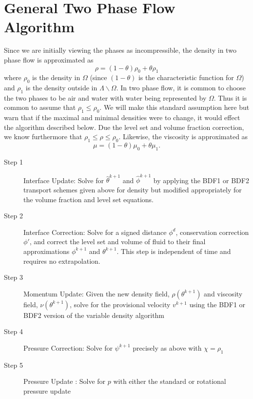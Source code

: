 \documentclass[letterpaper]{erdc}
\begin{document}
%
%
%
\section{General Two Phase Flow Algorithm}\label{sec:General2PFlowAlgorithm}

Since we are initially viewing the phases as incompressible, the density in two
phase flow is approximated as
\begin{equation}
  \rho = (1-\theta) \rho_0 + \theta \rho_1
\end{equation}
where $\rho_0$ is the density in $\Omega$ (since $(1-\theta)$ is the
characteristic function for $\Omega$) and $\rho_1$ is the density outside in
$\Lambda\backslash\Omega$. In two phase flow, it is common to choose the two
phases to be air and water with water being represented by $\Omega$.  Thus it
is common to assume that $\rho_1 \leq \rho_0$.  We will make this standard
assumption here but warn that if the maximal and minimal densities were to
change, it would effect the algorithm described below. Due the level set and
volume fraction correction, we know furthermore that
$\rho_1 \leq \rho \leq \rho_0$.  Likewise, the viscosity is approximated as
\begin{equation}
  \mu = (1-\theta) \mu_0 + \theta \mu_1.
\end{equation}

\begin{description}
\item[Step 1] Interface Update: Solve for $\hat{\theta}^{k+1}$ and
  $\hat{\phi}^{k+1}$ by applying the BDF1 or BDF2 transport schemes given above
  for density but modified appropriately for the volume fraction and level set
  equations.
\item[Step 2] Interface Correction: Solve for a signed distance $\phi^d$,
  conservation correction $\phi'$, and correct the level set and volume of
  fluid to their final approximations $\phi^{k+1}$ and $\theta^{k+1}$. This
  step is independent of time and requires no extrapolation.
\item [Step 3] Momentum Update: Given the new density field,
  $\rho(\theta^{k+1})$ and viscosity field, $\nu(\theta^{k+1})$, solve for the
  provisional velocity $v^{k+1}$ using the BDF1 or BDF2 version of the variable
  density algorithm
\item [Step 4] Pressure Correction: Solve for $\psi^{k+1}$ precisely as above
  with $\chi=\rho_1$
\item [Step 5] Pressure Update : Solve for $p$ with either the standard or
  rotational pressure update
\end{description}
\end{document}
